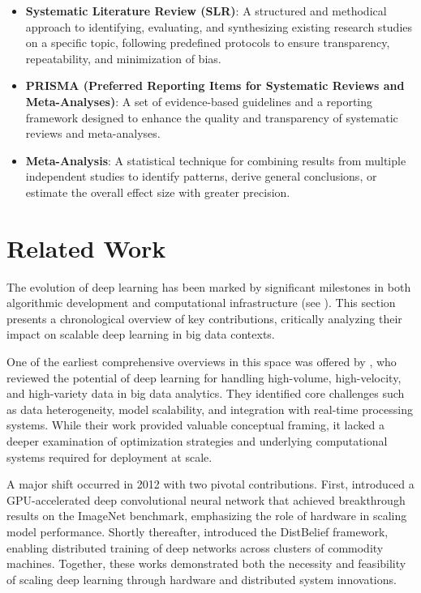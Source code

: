 \documentclass[acmsmall]{acmart}
\begin{document}
\begin{itemize}
    \item \textbf{Systematic Literature Review (SLR)}: A structured and methodical approach to identifying, evaluating, and synthesizing existing research studies on a specific topic, following predefined protocols to ensure transparency, repeatability, and minimization of bias.
    \item \textbf{PRISMA (Preferred Reporting Items for Systematic Reviews and Meta-Analyses)}: A set of evidence-based guidelines and a reporting framework designed to enhance the quality and transparency of systematic reviews and meta-analyses.
    \item \textbf{Meta-Analysis}: A statistical technique for combining results from multiple independent studies to identify patterns, derive general conclusions, or estimate the overall effect size with greater precision.
\end{itemize}

\section{Related Work}\label{sec:related-work}

The evolution of deep learning has been marked by significant milestones in both algorithmic development and computational infrastructure (see \citet{thompson2020computational,mayer2020scalable,capra2020hardware}).
This section presents a chronological overview of key contributions, critically analyzing their impact on scalable deep learning in big data contexts.

One of the earliest comprehensive overviews in this space was offered by \citet{najafabadi2015deep}, who reviewed the potential of deep learning for handling high-volume, high-velocity, and high-variety data in big data analytics. They identified core challenges such as data heterogeneity, model scalability, and integration with real-time processing systems. While their work provided valuable conceptual framing, it lacked a deeper examination of optimization strategies and underlying computational systems required for deployment at scale.

A major shift occurred in 2012 with two pivotal contributions. First, \citet{krizhevsky2012imagenet} introduced a GPU-accelerated deep convolutional neural network that achieved breakthrough results on the ImageNet benchmark, emphasizing the role of hardware in scaling model performance. Shortly thereafter, \citet{dean2012large} introduced the DistBelief framework, enabling distributed training of deep networks across clusters of commodity machines. Together, these works demonstrated both the necessity and feasibility of scaling deep learning through hardware and distributed system innovations.
\end{document}
